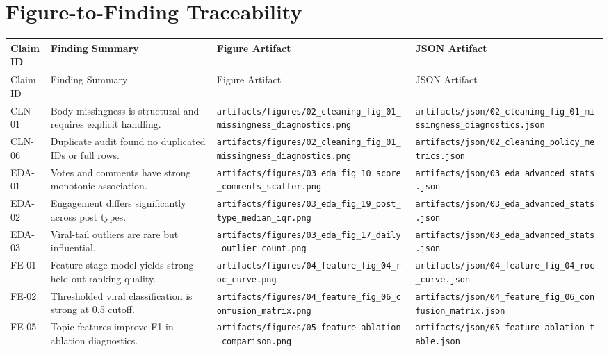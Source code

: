 \documentclass[11pt]{article}
\begin{document}
\section{Figure-to-Finding Traceability}
\begin{longtable}{p{} p{} p{} p{}}
\toprule
Claim ID & Finding Summary & Figure Artifact & JSON Artifact \\
\midrule
\endfirsthead
\toprule
Claim ID & Finding Summary & Figure Artifact & JSON Artifact \\
\midrule
\endhead
CLN-01 & Body missingness is structural and requires explicit handling. &
\texttt{artifacts/figures/02\_cleaning\_fig\_01\_missingness\_diagnostics.png} &
\texttt{artifacts/json/02\_cleaning\_fig\_01\_missingness\_diagnostics.json} \\
CLN-06 & Duplicate audit found no duplicated IDs or full rows. &
\texttt{artifacts/figures/02\_cleaning\_fig\_01\_missingness\_diagnostics.png} &
\texttt{artifacts/json/02\_cleaning\_policy\_metrics.json} \\
EDA-01 & Votes and comments have strong monotonic association. &
\texttt{artifacts/figures/03\_eda\_fig\_10\_score\_comments\_scatter.png} &
\texttt{artifacts/json/03\_eda\_advanced\_stats.json} \\
EDA-02 & Engagement differs significantly across post types. &
\texttt{artifacts/figures/03\_eda\_fig\_19\_post\_type\_median\_iqr.png} &
\texttt{artifacts/json/03\_eda\_advanced\_stats.json} \\
EDA-03 & Viral-tail outliers are rare but influential. &
\texttt{artifacts/figures/03\_eda\_fig\_17\_daily\_outlier\_count.png} &
\texttt{artifacts/json/03\_eda\_advanced\_stats.json} \\
FE-01 & Feature-stage model yields strong held-out ranking quality. &
\texttt{artifacts/figures/04\_feature\_fig\_04\_roc\_curve.png} &
\texttt{artifacts/json/04\_feature\_fig\_04\_roc\_curve.json} \\
FE-02 & Thresholded viral classification is strong at 0.5 cutoff. &
\texttt{artifacts/figures/04\_feature\_fig\_06\_confusion\_matrix.png} &
\texttt{artifacts/json/04\_feature\_fig\_06\_confusion\_matrix.json} \\
FE-05 & Topic features improve F1 in ablation diagnostics. &
\texttt{artifacts/figures/05\_feature\_ablation\_comparison.png} &
\texttt{artifacts/json/05\_feature\_ablation\_table.json} \\
\bottomrule
\end{longtable}
\end{document}
